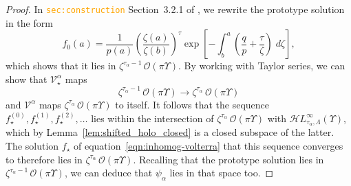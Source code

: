 \documentclass{article}
\newcommand{\singexp}[2]{\mathcal{H}L^\infty_{#1, #2}}
\newcommand{\volterra}{\mathcal{V}}
\newcommand{\softpart}{\mathcal{V}_\star}
\newcommand{\solproto}{f_0}
\newcommand{\solptb}{f_\star}
\theoremstyle{definition}
\theoremstyle{plain}
\begin{document}
\begin{proof}
In \textcolor{orange}{\tt sec:construction} Section~3.2.1 of \cite{reg-sing-volterra}, we rewrite the prototype solution in the form
\[ \solproto(a) = \frac{1}{p(a)} \left(\frac{\zeta(a)}{\zeta(b)}\right)^\tau \exp\left[-\int_b^a \left( \frac{q}{p} + \frac{\tau}{\zeta} \right)\;d\zeta\right], \]
which shows that it lies in $\zeta^{\tau_\alpha - 1}\,\mathcal{O}(\pi \Upsilon)$. By working with Taylor series, we can show that $\softpart^\alpha$ maps
\[ \zeta^{\tau_\alpha-1}\,\mathcal{O}(\pi \Upsilon) \to \zeta^{\tau_\alpha}\,\mathcal{O}(\pi \Upsilon) \]
and $\volterra^\alpha$ maps $\zeta^{\tau_\alpha}\,\mathcal{O}(\pi \Upsilon)$ to itself. It follows that the sequence $\solptb^{(0)}, \solptb^{(1)}, \solptb^{(2)}, \ldots$ lies within the intersection of $\zeta^{\tau_\alpha}\,\mathcal{O}(\pi \Upsilon)$ with $\singexp{\tau_\alpha}{\Lambda}(\Upsilon)$, which by Lemma~\ref{lem:shifted_holo_closed} is a closed subspace of the latter. The solution $\solptb$ of equation~\eqref{eqn:inhomog-volterra} that this sequence converges to therefore lies in $\zeta^{\tau_\alpha}\,\mathcal{O}(\pi \Upsilon)$. Recalling that the prototype solution lies in $\zeta^{\tau_\alpha - 1}\,\mathcal{O}(\pi \Upsilon)$, we can deduce that $\psi_\alpha$ lies in that space too.


\end{proof}
\end{document}
